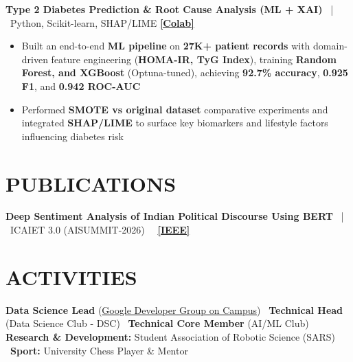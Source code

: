 \documentclass[a4paper,10pt]{article}
\begin{document}
\vspace{2pt}
\textbf{Type 2 Diabetes Prediction \& Root Cause Analysis (ML + XAI)} \ | \ Python, Scikit-learn, SHAP/LIME \hfill  \href{https://colab.research.google.com/drive/1Az2UStytGZSfXifVXz3vzlCuv6JcI8jF?usp=sharing}{\textbf{[Colab]}}
\begin{itemize}
\item Built an end-to-end \textbf{ML pipeline} on \textbf{27K+ patient records} with domain-driven feature engineering (\textbf{HOMA-IR, TyG Index}), training \textbf{Random Forest, and XGBoost} (Optuna-tuned), achieving \textbf{92.7\% accuracy}, \textbf{0.925 F1}, and \textbf{0.942 ROC-AUC}
\item Performed \textbf{SMOTE vs original dataset} comparative experiments and integrated \textbf{SHAP/LIME} to surface key biomarkers and lifestyle factors influencing diabetes risk
\end{itemize}

\section*{PUBLICATIONS}
\textbf{Deep Sentiment Analysis of Indian Political Discourse Using BERT} \ | \ ICAIET 3.0 (AISUMMIT-2026) \ \hfill \ \href{https://ieeexplore.ieee.org/stamp/stamp.jsp?}{\textbf{[IEEE]}}

\section*{ACTIVITIES}
\textbf{Data Science Lead} (\href{https://gdg.community.dev/u/m534t4/}{Google Developer Group on Campus}) \textbar\ \textbf{Technical Head} (Data Science Club - DSC) \textbar\ \textbf{Technical Core Member} (AI/ML Club) \\
\textbf{Research \& Development:} Student Association of Robotic Science (SARS) \textbar\ \textbf{Sport:} University Chess Player \& Mentor

\end{document}
